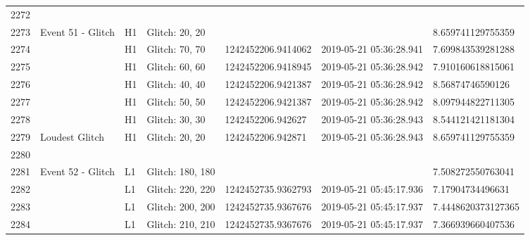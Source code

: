 \begin{longtable}{lllllll}
2272 &                                                    &          &                   &                     &                          &                     \\
2273 &                                  Event 51 - Glitch &       H1 &    Glitch: 20, 20 &                     &                          &   8.659741129755359 \\
2274 &                                                    &       H1 &    Glitch: 70, 70 &  1242452206.9414062 &  2019-05-21 05:36:28.941 &   7.699843539281288 \\
2275 &                                                    &       H1 &    Glitch: 60, 60 &  1242452206.9418945 &  2019-05-21 05:36:28.942 &   7.910160618815061 \\
2276 &                                                    &       H1 &    Glitch: 40, 40 &  1242452206.9421387 &  2019-05-21 05:36:28.942 &    8.56874746590126 \\
2277 &                                                    &       H1 &    Glitch: 50, 50 &  1242452206.9421387 &  2019-05-21 05:36:28.942 &   8.097944822711305 \\
2278 &                                                    &       H1 &    Glitch: 30, 30 &   1242452206.942627 &  2019-05-21 05:36:28.943 &   8.544121421181304 \\
2279 &                                     Loudest Glitch &       H1 &    Glitch: 20, 20 &   1242452206.942871 &  2019-05-21 05:36:28.943 &   8.659741129755359 \\
2280 &                                                    &          &                   &                     &                          &                     \\
2281 &                                  Event 52 - Glitch &       L1 &  Glitch: 180, 180 &                     &                          &   7.508272550763041 \\
2282 &                                                    &       L1 &  Glitch: 220, 220 &  1242452735.9362793 &  2019-05-21 05:45:17.936 &    7.17904734496631 \\
2283 &                                                    &       L1 &  Glitch: 200, 200 &  1242452735.9367676 &  2019-05-21 05:45:17.937 &  7.4448620373127365 \\
2284 &                                                    &       L1 &  Glitch: 210, 210 &  1242452735.9367676 &  2019-05-21 05:45:17.937 &   7.366939660407536 \\

\end{longtable}
